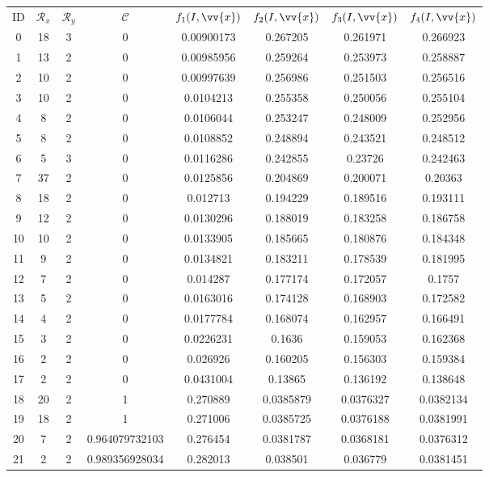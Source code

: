 \scriptsize
\begin{longtable}{|c|c|c|c|c|c|c|c|}
\hline
ID & $\mathscr{R}_x$ & $\mathscr{R}_y$ & $\mathscr{C}$ & $f_1(I,\vv{x})$ & $f_2(I,\vv{x})$ & $f_3(I,\vv{x})$ & $f_4(I,\vv{x})$ \\
0 & 18 & 3 & 0 & 0.00900173 & 0.267205 & 0.261971 & 0.266923 \\
1 & 13 & 2 & 0 & 0.00985956 & 0.259264 & 0.253973 & 0.258887 \\
2 & 10 & 2 & 0 & 0.00997639 & 0.256986 & 0.251503 & 0.256516 \\
3 & 10 & 2 & 0 & 0.0104213 & 0.255358 & 0.250056 & 0.255104 \\
4 & 8 & 2 & 0 & 0.0106044 & 0.253247 & 0.248009 & 0.252956 \\
5 & 8 & 2 & 0 & 0.0108852 & 0.248894 & 0.243521 & 0.248512 \\
6 & 5 & 3 & 0 & 0.0116286 & 0.242855 & 0.23726 & 0.242463 \\
7 & 37 & 2 & 0 & 0.0125856 & 0.204869 & 0.200071 & 0.20363 \\
8 & 18 & 2 & 0 & 0.012713 & 0.194229 & 0.189516 & 0.193111 \\
9 & 12 & 2 & 0 & 0.0130296 & 0.188019 & 0.183258 & 0.186758 \\
10 & 10 & 2 & 0 & 0.0133905 & 0.185665 & 0.180876 & 0.184348 \\
11 & 9 & 2 & 0 & 0.0134821 & 0.183211 & 0.178539 & 0.181995 \\
12 & 7 & 2 & 0 & 0.014287 & 0.177174 & 0.172057 & 0.1757 \\
13 & 5 & 2 & 0 & 0.0163016 & 0.174128 & 0.168903 & 0.172582 \\
14 & 4 & 2 & 0 & 0.0177784 & 0.168074 & 0.162957 & 0.166491 \\
15 & 3 & 2 & 0 & 0.0226231 & 0.1636 & 0.159053 & 0.162368 \\
16 & 2 & 2 & 0 & 0.026926 & 0.160205 & 0.156303 & 0.159384 \\
17 & 2 & 2 & 0 & 0.0431004 & 0.13865 & 0.136192 & 0.138648 \\
18 & 20 & 2 & 1 & 0.270889 & 0.0385879 & 0.0376327 & 0.0382134 \\
19 & 18 & 2 & 1 & 0.271006 & 0.0385725 & 0.0376188 & 0.0381991 \\
20 & 7 & 2 & 0.964079732103 & 0.276454 & 0.0381787 & 0.0368181 & 0.0376312 \\
21 & 2 & 2 & 0.989356928034 & 0.282013 & 0.038501 & 0.036779 & 0.0381451 \\

\end{longtable}
